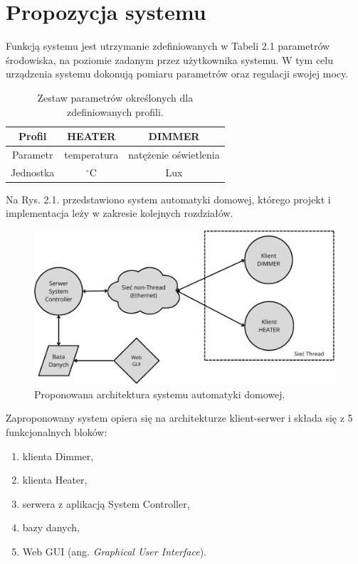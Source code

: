 \chapter{Propozycja systemu}
\label{cha:propozycja-systemu}

Funkcją systemu jest utrzymanie zdefiniowanych w Tabeli 2.1 parametrów środowiska, na poziomie zadanym przez użytkownika systemu. W tym celu urządzenia systemu dokonują pomiaru parametrów oraz regulacji swojej mocy.

\begin{table}[H]
    \centering
    \caption{Zestaw parametrów określonych dla zdefiniowanych profili.}
    \begin{tabular}{|c|c|c|}
         \hline
         Profil & HEATER & DIMMER \\
         \hline
         Parametr & temperatura & natężenie oświetlenia \\
         \hline
         Jednostka & $^{\circ}$C & Lux \\
         \hline
    \end{tabular}
    \label{tab:my_label}
\end{table}

Na Rys. 2.1. przedstawiono system automatyki domowej, którego projekt i implementacja leży w zakresie kolejnych rozdziałów.

\begin{figure}[H]
    \centering
    \includegraphics[width=0.8\linewidth]{graphics/system-architecture.png}
    \caption{Proponowana architektura systemu automatyki domowej.}
    \label{fig:system-architecture}
\end{figure}

Zaproponowany system opiera się na architekturze klient-serwer i składa się z 5 funkcjonalnych bloków:
\begin{enumerate}
    \item klienta Dimmer,
    \item klienta Heater,
    \item serwera z aplikacją System Controller,
    \item bazy danych,
    \item Web GUI (ang. \textit{Graphical User Interface}).
\end{enumerate}


